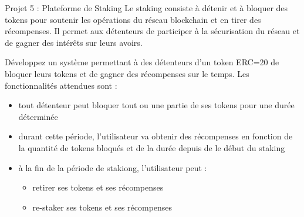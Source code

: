 \begin{frame}{Projet 5 : Plateforme de Staking}
  Le staking consiste à détenir et à bloquer des tokens pour soutenir les opérations du réseau blockchain et en tirer des récompenses.
  Il permet aux détenteurs de participer à la sécurisation du réseau et de gagner des intérêts sur leurs avoirs.

  Développez un système permettant à des détenteurs d'un token ERC=20 de bloquer leurs tokens et de gagner des récompenses sur le temps.
  Les fonctionnalités attendues sont :

  \begin{itemize}
    \item tout détenteur peut bloquer tout ou une partie de ses tokens pour une durée déterminée
    \item durant cette période, l'utilisateur va obtenir des récompenses en fonction de la quantité de tokens bloqués et de la durée depuis de le début du staking
    \item à la fin de la période de stakiong, l'utilisateur peut :
          \begin{itemize}
            \item retirer ses tokens et ses récompenses
            \item re-staker ses tokens et ses récompenses
          \end{itemize}
  \end{itemize}
\end{frame}
